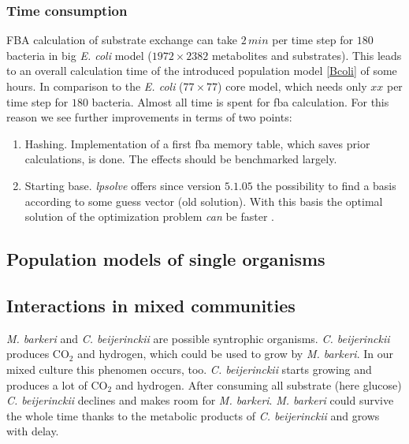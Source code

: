 \subsubsection{Time consumption}
FBA calculation of substrate exchange can take $2\,min$ per time step for $180$ bacteria in big \textit{E. coli} model ($1972\times 2382$ metabolites and substrates).
This leads to an overall calculation time of the introduced population model \ref{Bcoli} of some hours.
In comparison to the \textit{E. coli} ($77\times 77$) core model, which needs only $xx$ per time step for $180$ bacteria.
Almost all time is spent for fba calculation.
For this reason we see further improvements in terms of two points:
\begin{enumerate}
  \item Hashing. Implementation of a first fba memory table, which saves prior calculations, is done.
    The effects should be benchmarked largely.
  \item Starting base. \textit{lpsolve} offers since version $5.1.05$ the possibility to find a basis according to some guess vector (old solution).
    With this basis the optimal solution of the optimization problem \textit{can} be faster \cite{warmstart}.
\end{enumerate}




\subsection{Population models of single organisms}

\subsection{Interactions in mixed communities}
\textit{M. barkeri} and \textit{C. beijerinckii} are possible syntrophic organisms.
\textit{C. beijerinckii} produces CO$_2$ and hydrogen, which could be used to grow by \textit{M. barkeri}.
In our mixed culture this phenomen occurs, too.
\textit{C. beijerinckii} starts growing and produces a lot of CO$_2$ and hydrogen.
After consuming all substrate (here glucose) \textit{C. beijerinckii} declines and makes room for \textit{M. barkeri}.
\textit{M. barkeri} could survive the whole time thanks to the metabolic products of \textit{C. beijerinckii} and grows with delay.


